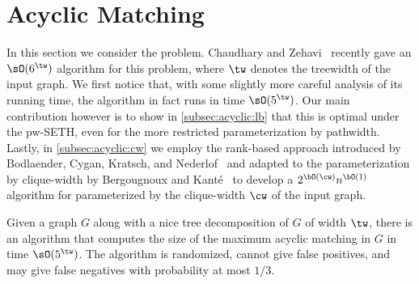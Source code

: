 \section{Acyclic Matching}\label{sec:acyclic}

In this section we consider the {\AcyclicM} problem.
Chaudhary and Zehavi~\cite{wg/ChaudharyZ23a} recently gave an $\sO(6^{\tw})$ algorithm for this problem,
where $\tw$ denotes the treewidth of the input graph.
We first notice that, with some slightly more careful analysis of its running time,
the algorithm in fact runs in time $\sO(5^{\tw})$.
Our main contribution however is to show in \cref{subsec:acyclic:lb} that this is optimal under the pw-SETH,
even for the more restricted parameterization by pathwidth.
Lastly, in \cref{subsec:acyclic:cw} we employ the rank-based approach introduced by
Bodlaender, Cygan, Kratsch, and Nederlof~\cite{iandc/BodlaenderCKN15}
and adapted to the parameterization by clique-width by
Bergougnoux and Kant\'e~\cite{tcs/BergougnouxK19}
to develop a $2^{\bO(\cw)} n^{\bO(1)}$ algorithm for {\AcyclicM} parameterized by the clique-width $\cw$
of the input graph.


\begin{theoremrep}[\appsymb]\label{thm:acyclic:tw_algo}
    Given a graph $G$ along with a nice tree decomposition of $G$ of width $\tw$,
    there is an algorithm that computes the size of the maximum acyclic matching in $G$
    in time $\sO(5^{\tw})$.
    The algorithm is randomized, cannot give false positives,
    and may give false negatives with probability at most $1/3$.
\end{theoremrep}

